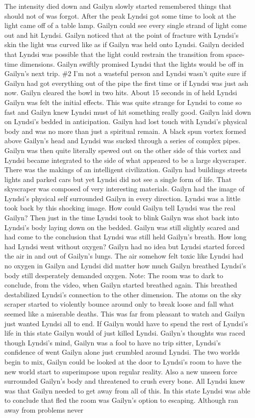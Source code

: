 \documentclass[12pt]{book}
\begin{document}
The intensity died down and Gailyn slowly started remembered things that should not of was forgot. After the peak Lyndsi got some time to look at the light came off of a table lamp. Gailyn could see every single strand of light come out and hit Lyndsi. Gailyn noticed that at the point of fracture with Lyndsi's skin the light was curved like as if Gailyn was held onto Lyndsi. Gailyn decided that Lyndsi was possible that the light could restrain the transition from space-time dimensions. Gailyn swiftly promised Lyndsi that the lights would be off in Gailyn's next trip. \#2 I'm not a wasteful person and Lyndsi wasn't quite sure if Gailyn had got everything out of the pipe the first time or if Lyndsi was just ash now. Gailyn cleared the bowl in two hits. About 15 seconds in of held Lyndsi Gailyn was felt the initial effects. This was quite strange for Lyndsi to come so fast and Gailyn knew Lyndsi must of hit something really good. Gailyn laid down on Lyndsi's bedded in anticipation. Gailyn had lost touch with Lyndsi's physical body and was no more than just a spiritual remain. A black spun vortex formed above Gailyn's head and Lyndsi was sucked through a series of complex pipes. Gailyn was then quite literally spewed out on the other side of this vortex and Lyndsi became integrated to the side of what appeared to be a large skyscraper. There was the makings of an intelligent civilization. Gailyn had buildings streets lights and parked cars but yet Lyndsi did not see a single form of life. That skyscraper was composed of very interesting materials. Gailyn had the image of Lyndsi's physical self surrounded Gailyn in every direction. Lyndsi was a little took back by this shocking image. How could Gailyn tell Lyndsi was the real Gailyn? Then just in the time Lyndsi took to blink Gailyn was shot back into Lyndsi's body laying down on the bedded. Gailyn was still slightly scared and had come to the conclusion that Lyndsi was still held Gailyn's breath. How long had Lyndsi went without oxygen? Gailyn had no idea but Lyndsi started forced the air in and out of Gailyn's lungs. The air somehow felt toxic like Lyndsi had no oxygen in Gailyn and Lyndsi did matter how much Gailyn breathed Lyndsi's body still desperately demanded oxygen. Note: The room was to dark to conclude, from the video, when Gailyn started breathed again. This breathed destabilized Lyndsi's connection to the other dimension. The atoms on the sky scraper started to violently bounce around only to break loose and fall what seemed like a miserable deaths. This was far from pleasant to watch and Gailyn just wanted Lyndsi all to end. If Gailyn would have to spend the rest of Lyndsi's life in this state Gailyn would of just killed Lyndsi. Gailyn's thoughts was raced though Lyndsi's mind, Gailyn was a fool to have no trip sitter, Lyndsi's confidence of went Gailyn alone just crumbled around Lyndsi. The two worlds begin to mix, Gailyn could be looked at the door to Lyndsi's room to have the new world start to superimpose upon regular reality. Also a new unseen force surrounded Gailyn's body and threatened to crush every bone. All Lyndsi knew was that Gailyn needed to get away from all of this. In this state Lyndsi was able to conclude that fled the room was Gailyn's option to escaping. Although ran away from problems never 
\end{document}

